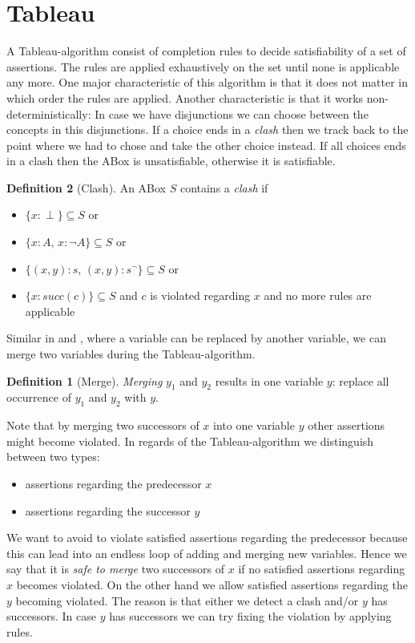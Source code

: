 \documentclass[a4paper,11pt]{scrartcl}
\theoremstyle{break}
\theoremstyle{definition}
\newtheorem{mydef}{Definition}
\begin{document}
\section{Tableau}
A Tableau-algorithm consist of completion rules to decide satisfiability of a set of assertions. The rules are applied exhaustively on the set until none is applicable any more. One major characteristic of this algorithm is that it does not matter in which order the rules are applied. Another characteristic is that it works non-deterministically: In case we have disjunctions we can choose between the concepts in this disjunctions. If a choice ends in a \textit{clash} then we track back to the point where we had to chose and take the other choice instead. If all choices ends in a clash then the ABox is unsatisfiable, otherwise it is satisfiable.
\begin{mydef}[Clash]
An ABox $S$ contains a \textit{clash} if
\begin{itemize}
\item $\{x:\perp\}\subseteq S$ or
\item $\{x:A,\,x:\neg A\}\subseteq S$ or
\item $\{(x,y):s,\,(x,y):s^\neg\}\subseteq S$ or
\item $\{x:succ(c)\}\subseteq S$ and $c$ is violated regarding $x$ and no more rules are applicable
\end{itemize}
Similar in \cite{1} and \cite{6}, where a variable can be replaced by another variable, we can merge two variables during the Tableau-algorithm.
\begin{mydef}[Merge]
\textit{Merging} $y_1$ and $y_2$ results in one variable $y$: replace all occurrence of $y_1$ and $y_2$ with $y$.
\end{mydef}
Note that by merging two successors of $x$ into one variable $y$ other assertions might become violated. In regards of the Tableau-algorithm we distinguish between two types:
\begin{itemize}
\item assertions regarding the predecessor $x$
\item assertions regarding the successor $y$
\end{itemize}
We want to avoid to violate satisfied assertions regarding the predecessor because this can lead into an endless loop of adding and merging new variables. Hence we say that it is \textit{safe to merge} two successors of $x$ if no satisfied assertions regarding $x$ becomes violated. On the other hand we allow satisfied assertions regarding the $y$ becoming violated. The reason is that either we detect a clash and/or $y$ has successors. In case $y$ has successors we can try fixing the violation by applying rules.

\end{mydef}
\end{document}
